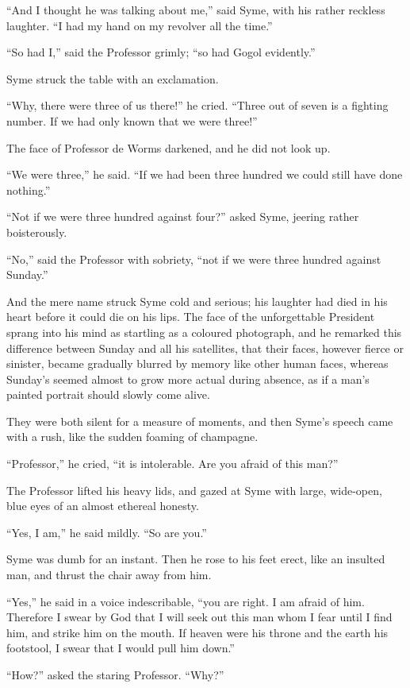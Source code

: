 “And I thought he was talking about me,” said Syme, with his rather reckless laughter. “I had my hand on my revolver all the time.”

“So had I,” said the Professor grimly; “so had Gogol evidently.”

Syme struck the table with an exclamation.

“Why, there were three of us there!” he cried. “Three out of seven is a fighting number. If we had only known that we were three!”

The face of Professor de Worms darkened, and he did not look up.

“We were three,” he said. “If we had been three hundred we could still have done nothing.”

“Not if we were three hundred against four?” asked Syme, jeering rather boisterously.

“No,” said the Professor with sobriety, “not if we were three hundred against Sunday.”

And the mere name struck Syme cold and serious; his laughter had died in his heart before it could die on his lips. The face of the unforgettable President sprang into his mind as startling as a coloured photograph, and he remarked this difference between Sunday and all his satellites, that their faces, however fierce or sinister, became gradually blurred by memory like other human faces, whereas Sunday’s seemed almost to grow more actual during absence, as if a man’s painted portrait should slowly come alive.

They were both silent for a measure of moments, and then Syme’s speech came with a rush, like the sudden foaming of champagne.

“Professor,” he cried, “it is intolerable. Are you afraid of this man?”

The Professor lifted his heavy lids, and gazed at Syme with large, wide-open, blue eyes of an almost ethereal honesty.

“Yes, I am,” he said mildly. “So are you.”

Syme was dumb for an instant. Then he rose to his feet erect, like an insulted man, and thrust the chair away from him.

“Yes,” he said in a voice indescribable, “you are right. I am afraid of him. Therefore I swear by God that I will seek out this man whom I fear until I find him, and strike him on the mouth. If heaven were his throne and the earth his footstool, I swear that I would pull him down.”

“How?” asked the staring Professor. “Why?”

